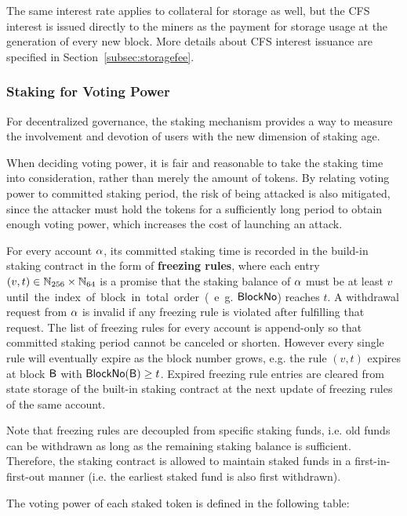 The same interest rate applies to collateral for storage as well, but the CFS interest is issued directly to the miners as the payment for storage usage at the generation of every new block.
More details about CFS interest issuance are specified in Section~\ref{subsec:storagefee}.


\subsubsection{Staking for Voting Power}

For decentralized governance, the staking mechanism provides a way to measure the involvement and devotion of users with the new dimension of staking age.

When deciding voting power, it is fair and reasonable to take the staking time into consideration,
rather than merely the amount of tokens.
By relating voting power to committed staking period, the risk of being attacked is also mitigated,
since the attacker must hold the tokens for a sufficiently long period to obtain enough voting power, which increases the cost of launching an attack.

For every account $\mathbf{\alpha}$, its committed staking time is recorded in the build-in staking contract in the form of 
{\bf freezing rules},
where each entry $(v,t)\in \mathbb{N}_{256}\times\mathbb{N}_{64}$ is a promise that the  staking balance of $\mathbf{\alpha}$ must be at least $v$ \unit until the index of block in total order (e.g. $\mathsf{BlockNo}$) reaches $t$.
A withdrawal request from $\mathbf{\alpha}$ is invalid if any freezing rule is violated after fulfilling that request.
The list of freezing rules for every account is append-only so that committed staking period cannot be canceled or shorten.
However every single rule will eventually expire as the block number grows, e.g. the rule $(v,t)$ expires at block $\textsf{B}$ with $\mathsf{BlockNo}(\textsf{B})\ge t$. 
Expired freezing rule entries are cleared from state storage of the built-in staking contract at the next update of freezing rules of the same account.	

Note that freezing rules are decoupled from specific staking funds, i.e. old funds can be withdrawn as long as the remaining staking balance is sufficient. 
Therefore, the staking contract is allowed to maintain staked funds in a first-in-first-out manner (i.e. the earliest staked fund is also first withdrawn).


The voting power of each staked token is defined in the following table:

